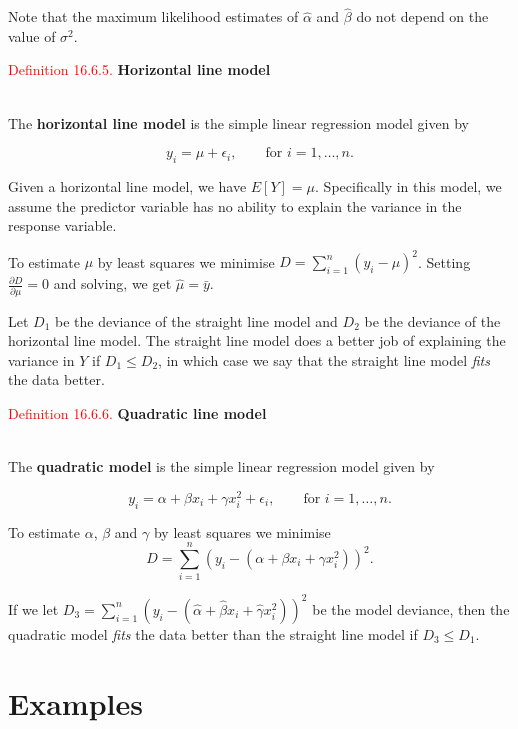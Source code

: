 \documentclass[
]{book}
\begin{document}
Note that the maximum likelihood estimates of \(\hat{\alpha}\) and \(\hat{\beta}\) do not depend on the value of \(\sigma^2\).

\leavevmode{}%
\textcolor{red}{Definition 16.6.5.}
{\textbf{Horizontal line model}}\\
\strut \\
The \textbf{horizontal line model} is the simple linear regression model given by

\[y_i = \mu + \epsilon_i, \qquad \text{for } i=1,\dots,n.\]

Given a horizontal line model, we have \(E[Y]=\mu\). Specifically in this model, we assume the predictor variable has no ability to explain the variance in the response variable.

To estimate \(\mu\) by least squares we minimise \(D = \sum\limits_{i=1}^n (y_i - \mu)^2\). Setting \(\frac{\partial D}{\partial \mu} = 0\) and solving, we get \(\hat{\mu} = \bar{y}\).

Let \(D_1\) be the deviance of the straight line model and \(D_2\) be the deviance of the horizontal line model. The straight line model does a better job of explaining the variance in \(Y\) if \(D_1 \leq D_2\), in which case we say that the straight line model \emph{fits} the data better.

\leavevmode{}%
\textcolor{red}{Definition 16.6.6.}
{\textbf{Quadratic line model}}\\
\strut \\
The \textbf{quadratic model} is the simple linear regression model given by

\[y_i = \alpha + \beta x_i + \gamma x_i^2 + \epsilon_i, \qquad \text{for } i=1,\dots,n.\]

To estimate \(\alpha\), \(\beta\) and \(\gamma\) by least squares we minimise\\

\[D = \sum\limits_{i=1}^n \left( y_i - (\alpha + \beta x_i + \gamma x_i^2) \right)^2.\]

If we let \(D_3 = \sum\limits_{i=1}^n \left( y_i - (\hat{\alpha} + \hat{\beta} x_i + \hat{\gamma} x_i^2) \right)^2\) be the model deviance, then the quadratic model \emph{fits} the data better than the straight line model if \(D_3 \leq D_1\).

\hypertarget{Sec_LinearI:Examples}{%
\section{Examples}\label{Sec_LinearI:Examples}}
\end{document}
